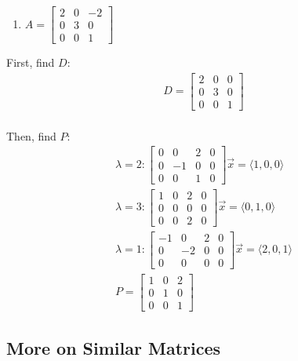 \documentclass[
  letterpaper,
  DIV=11,
  numbers=noendperiod]{scrartcl}
\providecommand{\tightlist}{%
  \setlength{\itemsep}{0pt}\setlength{\parskip}{0pt}}\usepackage{longtable,booktabs,array}
\begin{document}
\begin{enumerate}
\def\labelenumi{\arabic{enumi}.}
\setcounter{enumi}{1}
\tightlist
\item
  \(A = \begin{bmatrix}2 & 0 & -2 \\ 0 & 3 & 0 \\ 0 & 0 & 1\end{bmatrix}\)
\end{enumerate}

First, find \(D\): \begin{align*}
D = \begin{bmatrix} 2 & 0 & 0 \\ 0 & 3 & 0 \\ 0 & 0 & 1\end{bmatrix} \\
\end{align*}

Then, find \(P\): \begin{align*}
\lambda = 2: \left[\begin{array}{ccc|c}0 & 0 & 2 & 0 \\ 0 & -1 & 0 & 0 \\ 0 & 0 & 1 & 0\end{array}\right] \vec{x} = \langle1, 0, 0\rangle \\
\lambda = 3: \left[\begin{array}{ccc|c}1 & 0 & 2 & 0 \\ 0 & 0 & 0 & 0 \\ 0 & 0 & 2 & 0\end{array}\right] \vec{x} = \langle0, 1, 0\rangle \\
\lambda = 1: \left[\begin{array}{ccc|c}-1 & 0 & 2 & 0 \\ 0 & -2 & 0 & 0 \\ 0 & 0 & 0 & 0\end{array}\right] \vec{x} = \langle2, 0, 1\rangle \\
P = \begin{bmatrix}1 & 0 & 2 \\ 0 & 1 & 0 \\ 0 & 0 & 1\end{bmatrix}
\end{align*}

\hypertarget{more-on-similar-matrices}{%
\subsection{More on Similar Matrices}\label{more-on-similar-matrices}}
\end{document}
